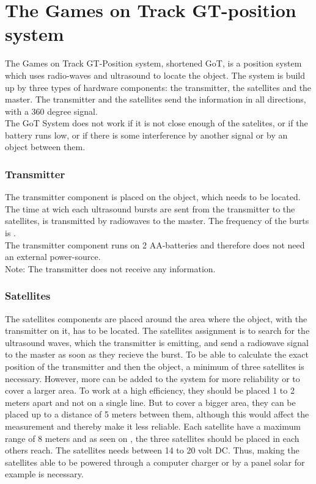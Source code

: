 \section{The Games on Track GT-position system}
The Games on Track GT-Position system, shortened GoT, is a position system which uses radio-waves and ultrasound to locate the object. The system is build up by three types of hardware components: the transmitter, the satellites and the master. The transmitter and the satellites send the information in all directions, with a 360 degree signal.\\
The GoT System does not work if it is not close enough of the satelites, or if the battery runs low, or if there is some interference by another signal or by an object between them.

\subsubsection{Transmitter}
The transmitter component is placed on the object, which needs to be located. The time at wich each ultrasound bursts are sent from the transmitter to the satellites, is transmitted by radiowaves to the master. The frequency of the burts is .\\
The transmitter component runs on 2 AA-batteries and therefore does not need an external power-source.\\
Note: The transmitter does not receive any information.

\subsubsection{Satellites}
The satellites components are placed around the area where the object, with the transmitter on it, has to be located. The satellites assignment is to search for the ultrasound waves, which the transmitter is emitting, and send a radiowave signal to the master as soon as they recieve the burst.
To be able to calculate the exact position of the transmitter and then the object, a minimum of three satellites is necessary. However, more can be added to the system for more reliability or to cover a larger area. To work at a high efficiency, they should be placed 1 to 2 meters apart and not on a single line. But to cover a bigger area, they can be placed up to a distance of 5 meters between them, although this would affect the measurement and thereby make it less reliable. Each satellite have a maximum range of 8 meters and as seen on , the three satellites should be placed in each others reach. The satellites needs between 14 to 20 volt DC. Thus, making the satellites able to be powered through a computer charger or by a panel solar for example is necessary.

